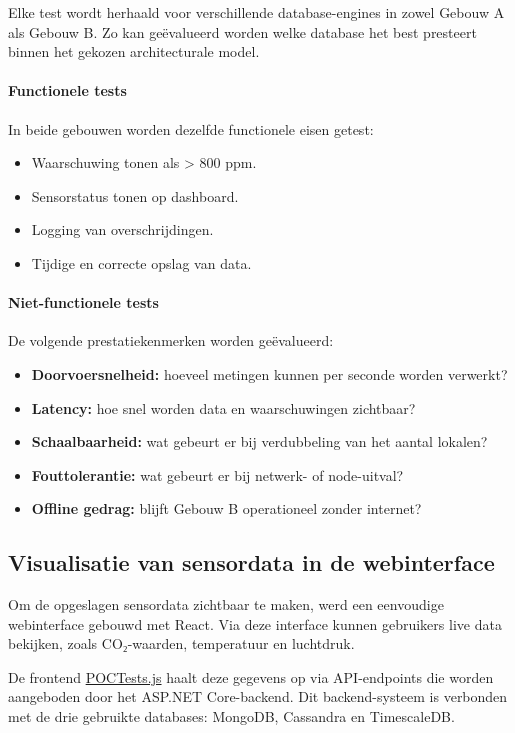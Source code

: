 Elke test wordt herhaald voor verschillende database-engines in zowel Gebouw A als Gebouw B. Zo kan geëvalueerd worden welke database het best presteert binnen het gekozen architecturale model.

\paragraph{Functionele tests}
In beide gebouwen worden dezelfde functionele eisen getest:
\begin{itemize}
    \item Waarschuwing tonen als  > 800 ppm.
    \item Sensorstatus tonen op dashboard.
    \item Logging van overschrijdingen.
    \item Tijdige en correcte opslag van data.
\end{itemize}

\paragraph{Niet-functionele tests}
De volgende prestatiekenmerken worden geëvalueerd:
\begin{itemize}
    \item \textbf{Doorvoersnelheid:} hoeveel metingen kunnen per seconde worden verwerkt?
    \item \textbf{Latency:} hoe snel worden data en waarschuwingen zichtbaar?
    \item \textbf{Schaalbaarheid:} wat gebeurt er bij verdubbeling van het aantal lokalen?
    \item \textbf{Fouttolerantie:} wat gebeurt er bij netwerk- of node-uitval?
    \item \textbf{Offline gedrag:} blijft Gebouw B operationeel zonder internet?
\end{itemize}

\subsection{Visualisatie van sensordata in de webinterface}

Om de opgeslagen sensordata zichtbaar te maken, werd een eenvoudige webinterface gebouwd met React. Via deze interface kunnen gebruikers live data bekijken, zoals CO₂-waarden, temperatuur en luchtdruk.

De frontend \href{https://github.com/WoutVC/bachelorproef2024/blob/main/proof_of_concept/backend/POCTests.js}{POCTests.js} haalt deze gegevens op via API-endpoints die worden aangeboden door het ASP.NET Core-backend. Dit backend-systeem is verbonden met de drie gebruikte databases: MongoDB, Cassandra en TimescaleDB.

